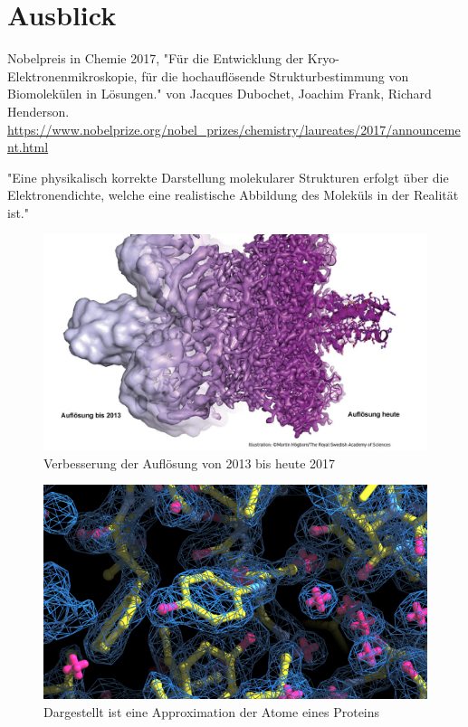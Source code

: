 \chapter{Ausblick}

Nobelpreis in Chemie 2017, "Für die Entwicklung der Kryo-Elektronenmikroskopie, für die hochauflösende Strukturbestimmung von Biomolekülen in Lösungen." von Jacques Dubochet, Joachim Frank, Richard Henderson. 
\url{https://www.nobelprize.org/nobel_prizes/chemistry/laureates/2017/announcement.html}


"Eine physikalisch korrekte Darstellung molekularer Strukturen erfolgt über die Elektronendichte, welche eine realistische Abbildung des Moleküls in der Realität ist."

\begin{figure}
    \centering
    \includegraphics[width=.95\textwidth]{images/Verbesserung_der_Aufloesung.jpg}
    \caption{Verbesserung der Auflösung von 2013 bis heute 2017}
    \label{fig:auflösung}
\end{figure}



\begin{figure}
    \centering
    \includegraphics[width=.95\textwidth]{images/approximation.png}
    \caption{Dargestellt ist eine Approximation der Atome eines Proteins}
    \label{fig:approximation}
\end{figure}

